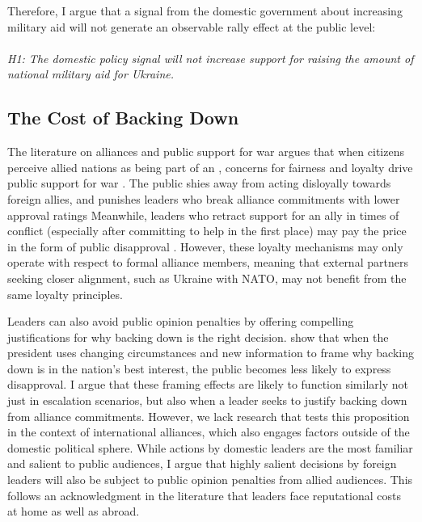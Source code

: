 Therefore, I argue that a signal from the domestic government about increasing military aid will not generate an observable rally effect at the public level: 
\paragraph{}
\textit{H1: The domestic policy signal will not increase support for raising the amount of national military aid for Ukraine.}

\subsection{The Cost of Backing Down}
The literature on alliances and public support for war argues that when citizens perceive allied nations as being part of an , concerns for fairness and loyalty drive public support for war \autocite{tomz_military_2021, tomz_how_2023}. The public shies away from acting disloyally towards foreign allies, and punishes leaders who break alliance commitments with lower approval ratings \autocite{chiba_careful_2015, tomz_military_2021, levin_art_2022} Meanwhile, leaders who retract support for an ally in times of conflict (especially after committing to help in the first place) may pay the price in the form of public disapproval \autocite{tomz_military_2021}. However, these loyalty mechanisms may only operate with respect to formal alliance members, meaning that external partners seeking closer alignment, such as Ukraine with NATO, may not benefit from the same loyalty principles.

Leaders can also avoid public opinion penalties by offering compelling justifications for why backing down is the right decision. \textcite{levendusky_when_2012} show that when the president uses changing circumstances and new information to frame why backing down is in the nation's best interest, the public becomes less likely to express disapproval. I argue that these framing effects are likely to function similarly not just in escalation scenarios, but also when a leader seeks to justify backing down from alliance commitments. However, we lack research that tests this proposition in the context of international alliances, which also engages factors outside of the domestic political sphere. While actions by domestic leaders are the most familiar and salient to public audiences, I argue that highly salient decisions by foreign leaders will also be subject to public opinion penalties from allied audiences. This follows an acknowledgment in the literature that leaders face reputational costs at home as well as abroad. \autocite{levy_backing_2015, agadjanian_has_2020} 

